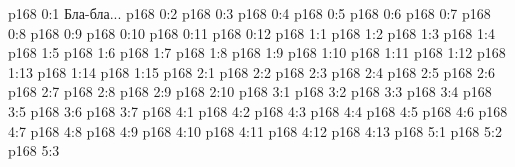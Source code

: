 \author{Промежуточные создания}
\vs p168 0:1  Бла-бла...
\vs p168 0:2 
\vs p168 0:3 
\vs p168 0:4 
\vs p168 0:5 
\vs p168 0:6 
\vs p168 0:7 
\vs p168 0:8 
\vs p168 0:9 
\vs p168 0:10 
\vs p168 0:11 
\vs p168 0:12 
\vs p168 1:1 
\vs p168 1:2 \pc 
\vs p168 1:3 
\vs p168 1:4 
\vs p168 1:5 
\vs p168 1:6 \pc 
\vs p168 1:7 
\vs p168 1:8 \pc 
\vs p168 1:9 
\vs p168 1:10 
\vs p168 1:11 
\vs p168 1:12 
\vs p168 1:13 
\vs p168 1:14 \pc 
\vs p168 1:15 
\vs p168 2:1 
\vs p168 2:2 
\vs p168 2:3 
\vs p168 2:4 
\vs p168 2:5 
\vs p168 2:6 \pc 
\vs p168 2:7 \pc 
\vs p168 2:8 \pc 
\vs p168 2:9 \pc 
\vs p168 2:10 
\vs p168 3:1 
\vs p168 3:2 \pc 
\vs p168 3:3 
\vs p168 3:4 
\vs p168 3:5 
\vs p168 3:6 
\vs p168 3:7 
\vs p168 4:1 
\vs p168 4:2 
\vs p168 4:3 
\vs p168 4:4 
\vs p168 4:5 
\vs p168 4:6 
\vs p168 4:7 
\vs p168 4:8 
\vs p168 4:9 
\vs p168 4:10 
\vs p168 4:11 
\vs p168 4:12 
\vs p168 4:13 
\vs p168 5:1 
\vs p168 5:2 
\vs p168 5:3 
\quizlink
